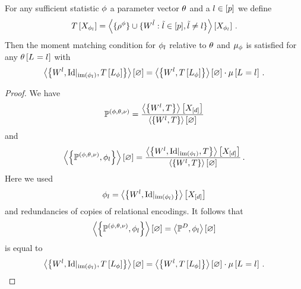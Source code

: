 \begin{lemma}\label{lem:mmContractionEquation}
	For any sufficient statistic $\phi$ a parameter vector $\theta$ and a $l\in[p]$ we define
	\begin{align*}
	 	T\left[X_{\phi_l}\right] 
		= \left\langle \{\rho^{\phi}\}\cup\{W^{\tilde{l}} : \tilde{l} \in [p], \tilde{l}\neq l\}\right\rangle \left[ X_{\phi_l} \right] \, . 
	\end{align*}
	Then the moment matching condition for $\phi_l$ relative to $\theta$ and $\mu_\phi$ is satisfied for any $\theta\left[L_{}=l_{}\right]$ with
	\begin{align*}
		\left\langle \left\{W^{l}, {\mathrm{Id}}|_{\mathrm{im}\left(\phi_l\right)}, T\left[L_\phi\right]\right\}\right\rangle \left[ \varnothing \right]
		= \left\langle \left\{W^{l}, T\left[L_\phi\right]\right\}\right\rangle \left[ \varnothing \right] \cdot \mu\left[L_{}=l_{}\right] \, . 
	\end{align*}
\end{lemma}
\begin{proof}
	We have
	\begin{align*}
		\mathbb{P}^{(\phi,\theta,\nu)} = \frac{
			\left\langle \left\{W^{l}, T\right\}\right\rangle \left[ X_{[d]} \right]
		}{
			\left\langle \left\{W^{l}, T\right\}\right\rangle \left[ \varnothing \right]
		}
	\end{align*}
	and 
	\begin{align*}
		\left\langle \left\{\mathbb{P}^{(\phi,\theta,\nu)}, \phi_l\right\}\right\rangle \left[ \varnothing \right]
		= \frac{
			\left\langle \left\{W^{l}, {\mathrm{Id}}|_{\mathrm{im}\left(\phi_l\right)}, T\right\}\right\rangle \left[ X_{[d]} \right]
		}{
			\left\langle \left\{W^{l}, T\right\}\right\rangle \left[ \varnothing \right]
		} \, . 
	\end{align*}
	Here we used
		\[ \phi_l = \left\langle \left\{W^{l}, {\mathrm{Id}}|_{\mathrm{im}\left(\phi_l\right)}\right\}\right\rangle \left[ X_{[d]} \right] \]
	and redundancies of copies of relational encodings.
	It follows that 
	\begin{align*}
		\left\langle \left\{\mathbb{P}^{(\phi,\theta,\nu)},\phi_l\right\}\right\rangle \left[ \varnothing \right] = \left\langle \mathbb{P}^{D},\phi_l\right\rangle \left[ \varnothing \right]
	\end{align*}
	is equal to
	\begin{align*}
		\left\langle \left\{W^{l}, {\mathrm{Id}}|_{\mathrm{im}\left(\phi_l\right)}, T\left[L_\phi\right]\right\}\right\rangle \left[ \varnothing \right]
		= \left\langle \left\{W^{l},T\left[L_\phi\right]\right\}\right\rangle \left[ \varnothing \right] \cdot \mu\left[L_{}=l_{}\right] \, . 
	\end{align*}	
\end{proof}

